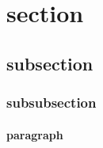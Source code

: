 \documentclass{article}
\begin{document}
	\tableofcontents
	
	\section{section}
	\subsection{subsection}
	\subsubsection{subsubsection}
	\paragraph{paragraph}
\end{document}
